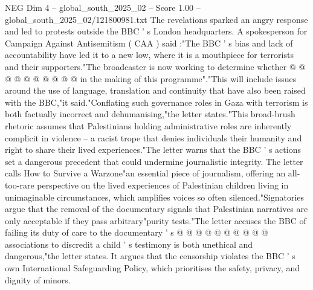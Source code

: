 \begin{textsample}{NEG Dim 4 – global\_south\_2025\_02 – Score 1.00 – global\_south\_2025\_02/121800981.txt}
The revelations sparked an angry response and led to protests outside the BBC ' s London headquarters.
A spokesperson for Campaign Against Antisemitism ( CAA ) said :"The BBC ' s bias and lack of accountability have led it to a new low, where it is a mouthpiece for terrorists and their supporters."The broadcaster is now working to determine whether @ @ @ @ @ @ @ @ @ @ in the making of this programme"."This will include issues around the use of language, translation and continuity that have also been raised with the BBC,"it said."Conflating such governance roles in Gaza with terrorism is both factually incorrect and dehumanising,"the letter states."This broad-brush rhetoric assumes that Palestinians holding administrative roles are inherently complicit in violence -- a racist trope that denies individuals their humanity and right to share their lived experiences."The letter warns that the BBC ' s actions set a dangerous precedent that could undermine journalistic integrity.
The letter calls How to Survive a Warzone"an essential piece of journalism, offering an all-too-rare perspective on the lived experiences of Palestinian children living in unimaginable circumstances, which amplifies voices so often silenced."Signatories argue that the removal of the documentary signals that Palestinian narratives are only acceptable if they pass arbitrary"purity tests."The letter accuses the BBC of failing its duty of care to the documentary ' s @ @ @ @ @ @ @ @ @ @ associations to discredit a child ' s testimony is both unethical and dangerous,"the letter states.
It argues that the censorship violates the BBC ' s own International Safeguarding Policy, which prioritises the safety, privacy, and dignity of minors.

\end{textsample}
